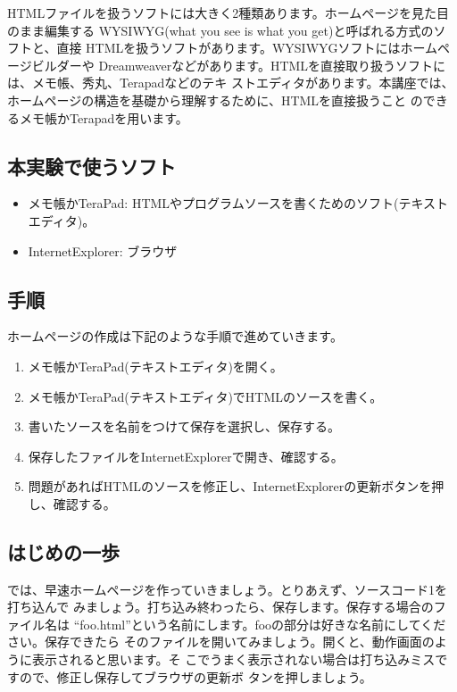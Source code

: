 \documentclass[12pt, a4j]{jsarticle}
\begin{document}
HTMLファイルを扱うソフトには大きく2種類あります。ホームページを見た目のまま編集する
WYSIWYG(what you see is what you get)と呼ばれる方式のソフトと、直接
HTMLを扱うソフトがあります。WYSIWYGソフトにはホームページビルダーや
Dreamweaverなどがあります。HTMLを直接取り扱うソフトには、メモ帳、秀丸、Terapadなどのテキ
ストエディタがあります。本講座では、ホームページの構造を基礎から理解するために、HTMLを直接扱うこと
のできるメモ帳かTerapadを用います。

\subsection{本実験で使うソフト}

\begin{itemize}
    \item メモ帳かTeraPad: HTMLやプログラムソースを書くためのソフト(テキストエディタ)。
    \item InternetExplorer: ブラウザ
\end{itemize}

\subsection{手順}
ホームページの作成は下記のような手順で進めていきます。

\begin{enumerate}
\item メモ帳かTeraPad(テキストエディタ)を開く。
\item メモ帳かTeraPad(テキストエディタ)でHTMLのソースを書く。
\item 書いたソースを名前をつけて保存を選択し、保存する。
\item 保存したファイルをInternetExplorerで開き、確認する。
\item 問題があればHTMLのソースを修正し、InternetExplorerの更新ボタンを押し、確認する。
\end{enumerate}


\subsection{はじめの一歩}

では、早速ホームページを作っていきましょう。とりあえず、ソースコード1を打ち込んで
みましょう。打ち込み終わったら、保存します。保存する場合のファイル名は
``foo.html''という名前にします。fooの部分は好きな名前にしてください。保存できたら
そのファイルを開いてみましょう。開くと、動作画面のように表示されると思います。そ
こでうまく表示されない場合は打ち込みミスですので、修正し保存してブラウザの更新ボ
タンを押しましょう。
\end{document}
